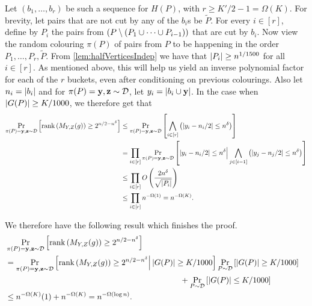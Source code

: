 Let $(b_1,\ldots,b_r)$ be such a sequence for $H(P)$, with $r \geq K'/2 - 1 = \Omega(K)$. For brevity, let pairs that are not cut by any of the $b_i$s be $\tilde{P}$. For every $i \in [r]$, define by $P_i$ the pairs from $\left( P \setminus \left( P_1 \cup \cdots \cup P_{i-1}\right) \right)$ that are cut by $b_i$. Now view the random colouring $\pi(P)$ of pairs from $P$ to be happening in the order $P_1,\ldots,P_r,\tilde{P}$. From \autoref{lem:halfVerticesIndep} we have that $\left|P_i\right| \geq n^{1/1500}$ for all $i \in [r]$. As mentioned above, this will help us yield an inverse polynomial factor for each of the $r$ buckets, even after conditioning on previous colourings. Also let $n_i = \left|b_i\right|$ and for $\pi(P)=\mathbf{y},\mathbf{z} \sim \mathcal{D}$, let $y_i = \left|b_i \cup \mathbf{y}\right|$. In the case when $\left|G(P)\right| \geq K/1000$, we therefore get that
\begin{align*}
\Pr_{\pi(P)=\mathbf{y},\mathbf{z} \sim \mathcal{D}} \left[\operatorname{rank}\left(M_{Y,Z}(g)\right) \geq 2^{n/2 - n^{\delta}}\right] &\leq \Pr_{\pi(P)=\mathbf{y},\mathbf{z} \sim \mathcal{D}} \left[\bigwedge_{i \in [r]} \left(\left|y_i - n_i/2\right| \leq n^{\delta}\right)\right]\\
&= \prod_{i \in [r]} \Pr_{\pi(P)=\mathbf{y},\mathbf{z} \sim \mathcal{D}} \left[ \left|y_i - n_i/2\right| \leq n^{\delta} \Big{|} \bigwedge_{j \in [i-1]} \left(\left|y_j - n_j/2\right| \leq n^{\delta}\right) \right]\\
&\leq \prod_{i \in [r]} O\left(\frac{2n^{\delta}}{\sqrt{\left|P_i\right|}}\right)\\
&\leq \prod_{i \in [r]} n^{-\Omega(1)} = n^{-\Omega(K)}.
\end{align*}

We therefore have the following result which finishes the proof.
\begin{align*}
&\Pr_{\pi(P)=\mathbf{y},\mathbf{z} \sim \mathcal{D}} \left[\operatorname{rank}\left(M_{Y,Z}(g)\right) \geq 2^{n/2 - n^{\delta}}\right] &\\
&= \Pr_{\pi(P)=\mathbf{y},\mathbf{z} \sim \mathcal{D}} \left[\operatorname{rank}\left(M_{Y,Z}(g)\right) \geq 2^{n/2 - n^{\delta}} \Big{|} \left|G(P)\right| \geq K/1000\right] \Pr_{P \sim \mathcal{D}} \left[\left|G(P)\right| \geq K/1000\right]\\
& \qquad \qquad \qquad \qquad \qquad \qquad \qquad \qquad \qquad \qquad \qquad + \Pr_{P \sim \mathcal{D}} \left[\left|G(P)\right| \leq K/1000\right]\\
&\leq n^{-\Omega(K)} (1) + n^{-\Omega(K)} = n^{-\Omega(\log n)}.\\
\end{align*}

